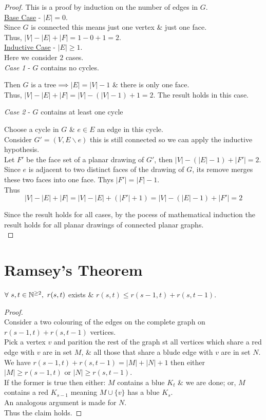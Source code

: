 \documentclass[11pt,a4paper]{article}
\begin{document}
\begin{proof}
This is a proof by induction on the number of edges in $G$.\\
\underline{Base Case} - $|E|=0$.\\
Since $G$ is connected this means just one vertex \& just one face.\\
Thus, $|V|-|E|+|F|=1-0+1=2$.\\

\underline{Inductive Case} - $|E|\geq1$.\\
Here we consider $2$ cases.\\
\textit{Case 1} - $G$ contains no cycles.
\begin{adjustwidth}{1cm}{}
Then $G$ is a tree$\implies|E|=|V|-1$ \& there is only one face.\\
Thus, $|V|-|E|+|F|=|V|-(|V|-1)+1=2$. The result holds in this case.\\
\end{adjustwidth}
\textit{Case 2} - $G$ contains at least one cycle
\begin{adjustwidth}{1cm}{}
Choose a cycle in $G$ \& $e\in E$ an edge in this cycle.\\
Consider $G'=(V,E\backslash e)$ this is still connected so we can apply the inductive hypothesis.\\
Let $F'$ be the face set of a planar drawing of $G'$, then $|V| - (|E|-1)+|F'|=2$.\\
Since $e$ is adjacent to two distinct faces of the drawing of $G$, its remove merges these two faces into one face. Thys $|F'|=|F|-1$.\\
Thus
$$|V|-|E|+|F|=|V|-|E|+(|F'|+1)=|V|-(|E|-1)+|F'|=2$$
\end{adjustwidth}
Since the result holds for all cases, by the pocess of mathematical induction the result holds for all planar drawings of connected planar graphs.\\
\end{proof}

\newpage
\section*{Ramsey's Theorem}
$\forall\ s,t\in\nats^{\geq2},\ r(s,t)$ exists \& $r(s,t)\leq r(s-1,t)+r(s,t-1)$.

\begin{proof}\hfill\\
Consider a two colouring of the edges on the complete graph on $r(s-1,t)+r(s,t-1)$ vertices.\\
Pick a vertex $v$ and parition the rest of the graph st all vertices which share a red edge with $v$ are in set $M$, \& all those that share a blude edge with $v$ are in set $N$.\\
We have $r(s-1,t)+r(s,t-1)=|M|+|N|+1$ then either $|M|\geq r(s-1,t)$ or $|N|\geq r(s,t-1)$.\\
If the former is true then either: $M$ contains a blue $K_t$ \& we are done; or, $M$ contains a red $K_{s-1}$ meaning $M\cup\{v\}$ has a blue $K_s$.\\
An analogous argument is made for $N$.\\
Thus the claim holds.
\end{proof}
\end{document}
